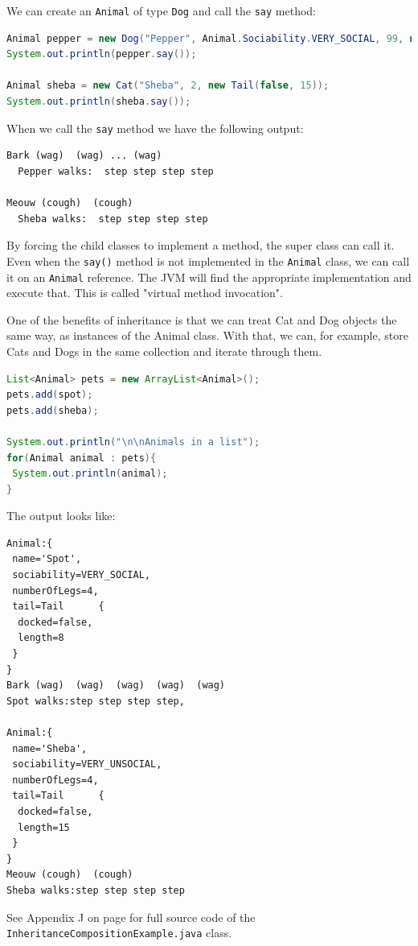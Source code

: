 We can create an \texttt{Animal} of type \texttt{Dog} and call the \texttt{say} method:

\begin{lstlisting}[language=Java]
Animal pepper = new Dog("Pepper", Animal.Sociability.VERY_SOCIAL, 99, new Tail(true, 1));
System.out.println(pepper.say());

Animal sheba = new Cat("Sheba", 2, new Tail(false, 15));
System.out.println(sheba.say());
\end{lstlisting}


When we call the \texttt{say} method we have the following output:
\begin{lstlisting}
Bark (wag)  (wag) ... (wag)
  Pepper walks:  step step step step

Meouw (cough)  (cough)
  Sheba walks:  step step step step
\end{lstlisting}

By forcing the child classes to implement a method, the super class can call it. Even when the \texttt{say()} method is not implemented in the \texttt{Animal} class, we can call it on an \texttt{Animal} reference. The JVM will find the appropriate implementation and execute that. This is called "virtual method invocation".

One of the benefits of inheritance is that we can treat Cat and Dog objects the same way, as instances of the Animal class. With that, we can, for example, store Cats and Dogs in the same collection and iterate through them.
\begin{lstlisting}[language=Java]
List<Animal> pets = new ArrayList<Animal>();
pets.add(spot);
pets.add(sheba);

System.out.println("\n\nAnimals in a list");
for(Animal animal : pets){
 System.out.println(animal);
}
\end{lstlisting}

The output looks like:
\begin{lstlisting}
Animal:{  
 name='Spot',
 sociability=VERY_SOCIAL,
 numberOfLegs=4,
 tail=Tail      {  
  docked=false,
  length=8
 }
}
Bark (wag)  (wag)  (wag)  (wag)  (wag) 
Spot walks:step step step step,

Animal:{  
 name='Sheba',
 sociability=VERY_UNSOCIAL,
 numberOfLegs=4,
 tail=Tail      {  
  docked=false,
  length=15
 }
}
Meouw (cough)  (cough)
Sheba walks:step step step step
\end{lstlisting}

See Appendix J on page \pageref{App:AppendixJ} for full source code of the \texttt{InheritanceCompositionExample.java} class.

